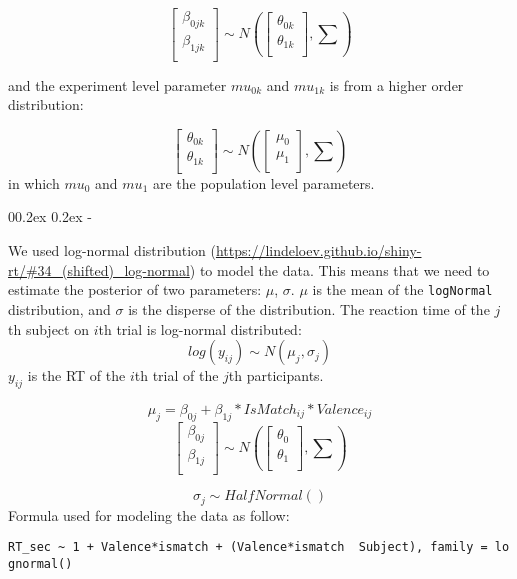 \documentclass[
  man]{apa6}
\makeatletter
\let\oldsubparagraph\subparagraph
\renewcommand{\subparagraph}[1]{\oldsubparagraph{#1}\mbox{}}
\renewcommand{\subparagraph}[1]{\@startsection{subparagraph}{5}{1em}%
  {0\baselineskip \@plus 0.2ex \@minus 0.2ex}%
  {-\z@\relax}%
  {\normalfont\normalsize\itshape\hspace{\parindent}{#1}\textit{\addperi}}{\relax}}
\makeatother
\begin{document}
\[\begin{bmatrix}\beta_{0jk}\\
\beta_{1jk}\\
\end{bmatrix} \sim N(\begin{bmatrix}\theta_{0k}\\
\theta_{1k}\\
\end{bmatrix}, \sum)\]

and the experiment level parameter \(mu_{0k}\) and \(mu_{1k}\) is from a higher order distribution:

\[\begin{bmatrix}\theta_{0k}\\
\theta_{1k}\\
\end{bmatrix} \sim N(\begin{bmatrix}\mu_{0}\\
\mu_{1}\\
\end{bmatrix}, \sum)\]
in which \(mu_{0}\) and \(mu_{1}\) are the population level parameters.

\hypertarget{reaction-times}{%
\subparagraph{Reaction times}\label{reaction-times}}

We used log-normal distribution (\url{https://lindeloev.github.io/shiny-rt/\#34_(shifted)_log-normal}) to model the data. This means that we need to estimate the posterior of two parameters: \(\mu\), \(\sigma\). \(\mu\) is the mean of the \texttt{logNormal} distribution, and \(\sigma\) is the disperse of the distribution.
The reaction time of the \(j\)th subject on \(i\)th trial is log-normal distributed:
\[ log(y_{ij}) \sim N(\mu_{j}, \sigma_{j})\]
\(y_{ij}\) is the RT of the \(i\)th trial of the \(j\)th participants.

\[\mu_{j} = \beta_{0j} + \beta_{1j}*IsMatch_{ij} * Valence_{ij}\]
\[ \begin{bmatrix}\beta_{0j}\\
\beta_{1j}\\
\end{bmatrix} \sim N(\begin{bmatrix}\theta_{0}\\
\theta_{1}\\
\end{bmatrix}, \sum) \]

\[\sigma_{j} \sim HalfNormal()\]
Formula used for modeling the data as follow:

\texttt{RT\_sec\ \textasciitilde{}\ 1\ +\ Valence*ismatch\ +\ (Valence*ismatch\ \textbar{}\ Subject),\ family\ =\ lognormal()}
\end{document}
